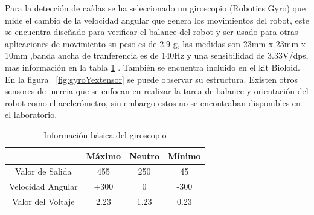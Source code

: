 
Para la detecci\'on de ca\'idas se ha seleccionado un giroscopio (Robotics Gyro) que mide el cambio de la velocidad angular que genera los movimientos del robot, este se encuentra diseñado para verificar el balance del robot y ser usado para otras aplicaciones de movimiento \cite{gyro} su peso es de 2.9 g, las medidas son 23mm x 23mm x 10mm ,banda ancha de tranferencia es de 140Hz y una sensibilidad de 3.33V/dps, mas informaci\'on en la tabla \ref{copio} . También se encuentra incluido en el kit Bioloid. En la figura ~\ref{fig:gyroYextensor} se puede observar su estructura. Existen otros sensores de inercia que se enfocan en realizar la tarea de balance y orientaci\'on del robot como el aceler\'ometro, sin embargo estos no se encontraban disponibles en el laboratorio.
\begin{table}
\centering
\begin{tabular}{|c | c c c|}
\hline 
 & M\'aximo & Neutro & M\'inimo \\ 
\hline
Valor de Salida & 455 & 250 & 45 \\ 

Velocidad Angular & +300 & 0 & -300 \\ 
 
Valor del Voltaje & 2.23 & 1.23 & 0.23 \\ 
\hline 
\end{tabular} 
\caption{Informaci\'on b\'asica del giroscopio}
\label{copio}

\end{table}

